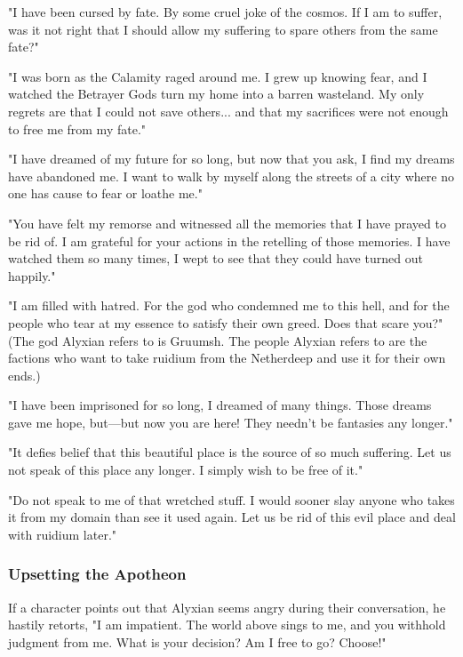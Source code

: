 \documentclass[10pt,a4paper,twoside,bg=print,twocolumn,openany,nodeprecatedcode]{dndbook}
\begin{document}
\begin{description}[nolistsep]
\item[Alyxian's Personality.]
"I have been cursed by fate. By some cruel joke of the cosmos. If I am to suffer, was it not right that I should allow my suffering to spare others from the same fate?"
\item[Alyxian's Past.]
"I was born as the Calamity raged around me. I grew up knowing fear, and I watched the Betrayer Gods turn my home into a barren wasteland. My only regrets are that I could not save others... and that my sacrifices were not enough to free me from my fate."
\item[Alyxian's Future.]
"I have dreamed of my future for so long, but now that you ask, I find my dreams have abandoned me. I want to walk by myself along the streets of a city where no one has cause to fear or loathe me."
\item[Alyxian's Regret.]
"You have felt my remorse and witnessed all the memories that I have prayed to be rid of. I am grateful for your actions in the retelling of those memories. I have watched them so many times, I wept to see that they could have turned out happily."
\item[Alyxian's Fury.]
"I am filled with hatred. For the god who condemned me to this hell, and for the people who tear at my essence to satisfy their own greed. Does that scare you?" (The god Alyxian refers to is Gruumsh. The people Alyxian refers to are the factions who want to take ruidium from the Netherdeep and use it for their own ends.)
\item[Alyxian's Yearning.]
"I have been imprisoned for so long, I dreamed of many things. Those dreams gave me hope, but—but now you are here! They needn't be fantasies any longer."
\item[The Heart of Despair.]
"It defies belief that this beautiful place is the source of so much suffering. Let us not speak of this place any longer. I simply wish to be free of it."
\item[Ruidium.]
"Do not speak to me of that wretched stuff. I would sooner slay anyone who takes it from my domain than see it used again. Let us be rid of this evil place and deal with ruidium later."
\end{description}




\subsubsection{Upsetting the Apotheon}
If a character points out that Alyxian seems angry during their conversation, he hastily retorts, "I am impatient. The world above sings to me, and you withhold judgment from me. What is your decision? Am I free to go? Choose!"
\end{document}
